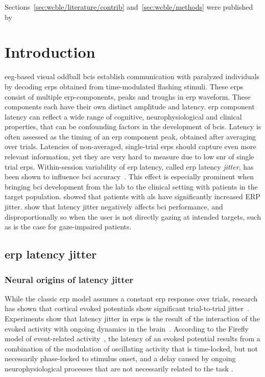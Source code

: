 Sections~\ref{sec:wcble/literature/contrib} and~\ref{sec:wcble/methods} were published
by~\textcite{VanDenKerchove2024}

\section{Introduction}
\label{sec:wcble/intro}

\Ac{eeg}-based visual oddball \acp{bci} establish communication with paralyzed
individuals by decoding \acp{erp} obtained from time-modulated flashing
stimuli.
These \acp{erp} consist of multiple \ac{erp}-components, peaks and troughs in
\ac{erp} waveform.
These components each have their own distinct amplitude and latency.
\Ac{erp} component latency can reflect a wide range of cognitive,
neurophysiological and clinical properties, that can be confounding factors in
the development of \acp{bci}.
Latency is often assessed as the timing of an \ac{erp} component peak, obtained
after averaging over trials.
Latencies of non-averaged, single-trial \acp{erp} should capture even more
relevant information, yet they are very hard to measure due to low \ac{snr} of
single trial \acp{erp}.
Within-session variability of \ac{erp} latency, called \ac{erp} latency
\emph{jitter}, has been shown to influence \ac{bci}
accuracy~\cite{Thompson2012}.
This effect is especially prominent when bringing \ac{bci} development from the
lab to the clinical setting with patients in the target population.
\textcite{Zisk2021} showed that patients with \ac{als} have significantly
increased ERP jitter.
\textcite{Arico2014} show that latency jitter negatively affects \ac{bci}
performance, and disproportionally so when the user is not directly gazing at
intended targets, such as is the case for gaze-impaired patients.

\subsection{\Acs{erp} latency jitter}

\subsubsection{Neural origins of latency jitter}
While the classic \ac{erp} model assumes a constant \ac{erp} response over trials,
research has shown that cortical evoked potentials show significant
trial-to-trial jitter~\cite{Truccolo2002}.
Experiments show that latency jitter in \acp{erp} is the result of the interaction of
the evoked activity with ongoing dynamics in the brain~\cite{Hasenstaub2007,
	Kisley1999, Curto2009, Arieli1996}.
According to the Firefly model of event-related activity~\cite{Burgess2012},
the latency of an evoked potential results from a combination of the modulation
of oscillating activity that is time-locked, but not necessarily phase-locked to stimulus onset,
and a delay caused by ongoing neurophysiological processes that are not necessarily related to the task
\cite{Stokes2016,Mouraux2008}.

